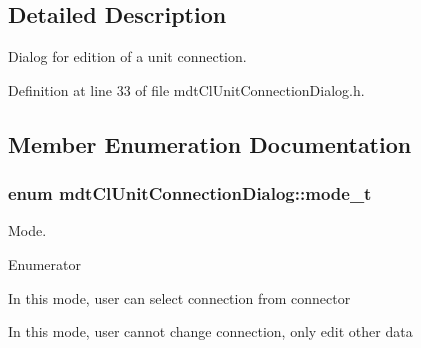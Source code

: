 \subsection{Detailed Description}
Dialog for edition of a unit connection. 

Definition at line 33 of file mdt\-Cl\-Unit\-Connection\-Dialog.\-h.



\subsection{Member Enumeration Documentation}
\hypertarget{classmdt_cl_unit_connection_dialog_a754889f1591eddb79b69de4c51532f43}{
\subsubsection[{mode\-\_\-t}]{\setlength{\rightskip}{0pt plus 5cm}enum {\bf mdt\-Cl\-Unit\-Connection\-Dialog\-::mode\-\_\-t}}}\label{classmdt_cl_unit_connection_dialog_a754889f1591eddb79b69de4c51532f43}


Mode. 

\begin{Desc}
\item[Enumerator]\par
\begin{description}
\item[{\em 
\hypertarget{classmdt_cl_unit_connection_dialog_a754889f1591eddb79b69de4c51532f43a65365660e45940b053efbf543aa2c10c}{Add}\label{classmdt_cl_unit_connection_dialog_a754889f1591eddb79b69de4c51532f43a65365660e45940b053efbf543aa2c10c}
}]In this mode, user can select connection from connector \item[{\em 
\hypertarget{classmdt_cl_unit_connection_dialog_a754889f1591eddb79b69de4c51532f43a855eaf8093ea6043e46688cc5115643f}{Edit}\label{classmdt_cl_unit_connection_dialog_a754889f1591eddb79b69de4c51532f43a855eaf8093ea6043e46688cc5115643f}
}]In this mode, user cannot change connection, only edit other data \end{description}
\end{Desc}


